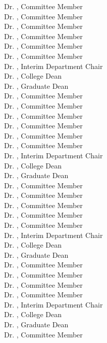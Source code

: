 \begin{titlepage}
Dr. \commemb, Committee Member\\
Dr. \commemc, Committee Member\\
Dr. \commemd, Committee Member\\
Dr. \commeme, Committee Member\\
Dr. \commemf, Committee Member\\
Dr. \commemg, Committee Member\\
Dr. \depchair, Interim Department Chair\\
Dr. \colldean, College Dean\\
Dr. \graddean, Graduate Dean\\
\else
\ifdefined\commemf
\noindent
Dr. \commema, Committee Member\\
Dr. \commemb, Committee Member\\
Dr. \commemc, Committee Member\\
Dr. \commemd, Committee Member\\
Dr. \commeme, Committee Member\\
Dr. \commemf, Committee Member\\
Dr. \depchair, Interim Department Chair\\
Dr. \colldean, College Dean\\
Dr. \graddean, Graduate Dean\\
\else
\ifdefined\commeme
Dr. \commema, Committee Member\\
Dr. \commemb, Committee Member\\
Dr. \commemc, Committee Member\\
Dr. \commemd, Committee Member\\
Dr. \commeme, Committee Member\\
Dr. \depchair, Interim Department Chair\\
Dr. \colldean, College Dean\\
Dr. \graddean, Graduate Dean\\
\else
\ifdefined\commemd
Dr. \commema, Committee Member\\
Dr. \commemb, Committee Member\\
Dr. \commemc, Committee Member\\
Dr. \commemd, Committee Member\\
Dr. \depchair, Interim Department Chair\\
Dr. \colldean, College Dean\\
Dr. \graddean, Graduate Dean\\
\else
\ifdefined\commemc
Dr. \commema, Committee Member\\

\end{titlepage}
